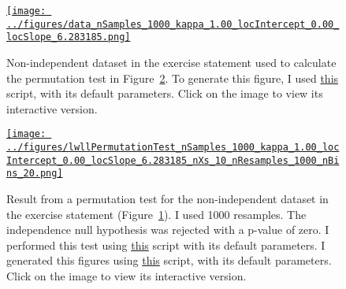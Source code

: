 \documentclass[12pt]{article}
\begin{document}
\begin{figure}
    \begin{center}
        \href{https://www.gatsby.ucl.ac.uk/~rapela/neuroinformatics/2023/ws4/figures/data_nSamples_1000_kappa_1.00_locIntercept_0.00_locSlope_6.283185.html}{\texttt{[image: ../figures/data\_nSamples\_1000\_kappa\_1.00\_locIntercept\_0.00\_locSlope\_6.283185.png]}}

        \caption{Non-independent dataset in the exercise statement used to
        calculate the permutation test in
        Figure~\ref{fig:perm_test_non_independent_data}. To generate this
        figure, I used
        \href{https://github.com/joacorapela/neuroinformatics23/blob/master/worksheets/ws4/mySolution/code/scripts/doPlotSampledData.py}{this}
        script, with its default parameters.  Click on the image to view its
        interactive version.}

        \label{fig:data_non_independent}

    \end{center}
\end{figure}

\begin{figure}
    \begin{center}
        \href{https://www.gatsby.ucl.ac.uk/~rapela/neuroinformatics/2023/ws4/figures/lwllPermutationTest_nSamples_1000_kappa_1.00_locIntercept_0.00_locSlope_6.283185_nXs_10_nResamples_1000_nBins_20.html}{\texttt{[image: ../figures/lwllPermutationTest\_nSamples\_1000\_kappa\_1.00\_locIntercept\_0.00\_locSlope\_6.283185\_nXs\_10\_nResamples\_1000\_nBins\_20.png]}}

        \caption{Result from a permutation test for the non-independent dataset
        in the exercise statement (Figure~\ref{fig:data_non_independent}). I
        used 1000 resamples. The independence null hypothesis was rejected with
        a p-value of zero. I performed this test using
        \href{https://github.com/joacorapela/neuroinformatics23/blob/master/worksheets/ws4/mySolution/code/scripts/doPermutationTestLWLL.py}{this}
        script with its default parameters. I generated this figures using
        \href{https://github.com/joacorapela/neuroinformatics23/blob/master/worksheets/ws4/mySolution/code/scripts/doPlotPermutationTestResult.py}{this}
        script, with its default parameters. Click on the image to view its
        interactive version.}

        \label{fig:perm_test_non_independent_data}

    \end{center}
\end{figure}
\end{document}
